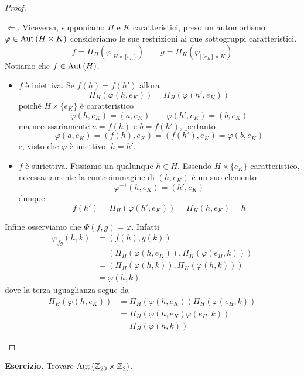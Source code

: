 \begin{multicols}{2}
\begin{proof}
\begin{itemize}
		$ \Leftarrow $. Viceversa, supponiamo $ H $ e $ K $ caratteristici, preso un automorfismo $ \varphi \in \mathrm{Aut}\left( H \times K \right)$ consideriamo le sue restrizioni ai due sottogruppi caratteristici.
		\[ f = \Pi_H \left( \varphi_{|H\times\{e_K\}} \right) \qquad g = \Pi_K \left( \varphi_{|\{e_H\}\times K} \right) \]
		Notiamo che $ f \in \mathrm{Aut}\left( H \right) $.
		\begin{itemize}
			\item $ f $ è iniettiva. Se $ f(h) = f(h') $ allora \[\Pi_H \left( \varphi(h, e_K) \right) = \Pi_H \left( \varphi(h', e_K) \right) \]
			poiché $ H\times\{e_K\} $ è caratteristico \[ \varphi(h, e_K) = (a, e_K) \qquad   \varphi(h', e_K) = (b, e_K) \]
			ma necessariamente $ a = f(h) $ e $ b = f(h') $, pertanto
			\[ \varphi(a, e_K) = (f(h), e_K) = (f(h'), e_K) = \varphi(b, e_K) \]
			e, visto che $ \varphi $ è iniettivo, $ h = h' $.
			\item $ f $ è suriettiva. Fissiamo un qualunque $ h \in H $. Essendo $ H\times\{e_K\} $ caratteristico, necessariamente la controimmagine di $ (h, e_K) $ è un suo elemento \[ \varphi^{-1}(h, e_K) = (h', e_K) \]
			dunque \[ f(h') =\Pi_H \left( \varphi(h', e_K) \right) = \Pi_H \left( h, e_K \right) = h \]
		\end{itemize}
		Infine osserviamo che $ \Phi(f, g) = \varphi $. Infatti
		\begin{align*} \varphi_{fg}(h, k) &= \left(f(h), g(k)\right)\\& = \left(\Pi_H \left( \varphi(h, e_K) \right), \Pi_K \left( \varphi(e_H, k) \right)\right) \\& =
		\left(\Pi_H \left( \varphi(h, k) \right), \Pi_K \left( \varphi(h, k) \right)\right) \\& =
		 \varphi(h, k) \end{align*}
		 dove la terza uguaglianza segue da
		 \begin{align*}
		 \Pi_H \left( \varphi(h, e_K) \right) &= \Pi_H \left( \varphi(h, e_K) \right)\Pi_H(\varphi(e_H, k)) \\
		 &= \Pi_H \left( \varphi(h, e_K)\varphi(e_H, k)\right) \\&= \Pi_H \left( \varphi(h, k)\right)
		 \end{align*}
	\end{itemize}
\end{proof}

\textbf{Esercizio.} Trovare $ \mathrm{Aut}\left( \mathbb{Z}_{20} \times \mathbb{Z}_{2}  \right) $.
\end{multicols}

